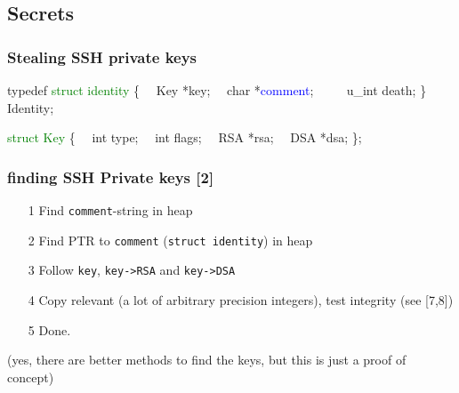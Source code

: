 \documentclass{beamer}
\begin{document}
	\subsection{Secrets}

		\begin{frame} \frametitle{Stealing SSH private keys}

		\end{frame}

		\begin{frame}[fragile]
			\begin{semiverbatim}
				typedef \textcolor{green}{struct identity} \{
				\ \ 	Key *key;
				\ \ 	char *\textcolor{blue}{comment};  
				\ \           
				\ \ 	u_int death;
				\} Identity;

				\textcolor{green}{struct Key} \{
				\ \ 	int      type;
				\ \ 	int      flags;
				\ \ 	RSA     *rsa;
				\ \ 	DSA     *dsa;
				\};
			\end{semiverbatim}
		\end{frame}

		\begin{frame} \frametitle{finding SSH Private keys [2]}
			\begin{itemize}
				\item[1] Find \texttt{comment}-string in heap
				\item[2] Find PTR to \texttt{comment} (\texttt{struct identity}) in heap
				\item[3] Follow \texttt{key}, \texttt{key->RSA} and \texttt{key->DSA}
				\item[4] Copy relevant (a lot of arbitrary precision integers), test integrity (see [7,8])
				\item[5] Done.
			\end{itemize}
			\scriptsize (yes, there are better methods to find the keys, but this is just a proof of concept)
		\end{frame}
\end{document}
